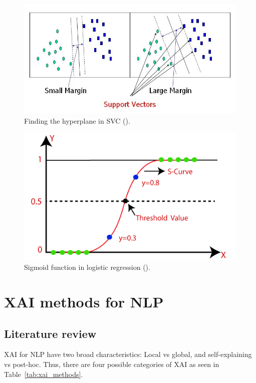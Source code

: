 \begin{figure}[!ht]
	\centering
	\includegraphics[width=1\linewidth]{figures/svc_viz.png}
	\caption{Finding the hyperplane in SVC (\cite{svc_viz}).}   
    \label{fig:svc_viz}
\end{figure}

\begin{figure}[!ht]
	\centering
	\includegraphics[width=1\linewidth]{figures/logistic_reg.png}
	\caption{Sigmoid function in logistic regression (\cite{log_reg_viz}).}   
    \label{fig:log_reg_viz}
\end{figure}


\section{XAI methods for NLP}
\subsection{Literature review}
XAI for NLP have two broad characteristics: Local vs global, and self-explaining vs post-hoc. Thus, there are four possible categories of XAI as seen in Table~\ref{tab:xai_methods}.

